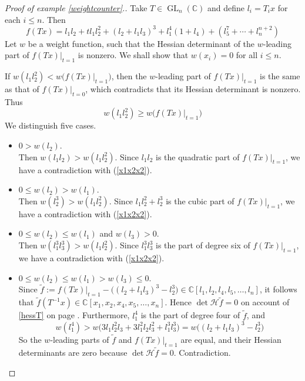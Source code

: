 \documentclass[10pt]{article}
\theoremstyle{remark}
\theoremstyle{definition}
\newcommand{\hess}{{\mathcal H}}
\newcommand{\GL}{\operatorname{GL}}
\newcommand{\C}{{\mathbb C}}
\begin{document}
\begin{proof}[Proof of example \ref{weightcounter}.]
Take $T \in \GL_n(\C)$ and define $l_i = T_i x$ for each $i \le n$. Then
$$
f(Tx) = l_1 l_2 + t l_1 l_2^2 + (l_2 + l_1 l_3)^3 + l_1^4 (1 + l_4) +
        (l_5^7 + \cdots + l_n^{n+2})
$$
Let $w$ be a weight function, such that the Hessian determinant of the $w$-leading part of 
$f(Tx)|_{t=1}$ is nonzero. We shall show that $w(x_i) = 0$ for all $i \le n$. 

If $w(l_1 l_2^2) < w\big(f(Tx)|_{t=1}\big)$, then the $w$-leading part of $f(Tx)|_{t=1}$
is the same as that of $f(Tx)|_{t=0}$, which contradicts that its Hessian determinant is
nonzero. Thus
\begin{equation} \label{x1x2x2}
w (l_1 l_2^2) \ge w \big(f(Tx)|_{t=1}\big)
\end{equation}
We distinguish five cases.
\begin{itemize}
 
\item $0 > w (l_2)$. \\
Then $w(l_1 l_2) > w(l_1 l_2^2)$. Since $l_1 l_2$ is the quadratic part of 
$f(Tx)|_{t=1}$, we have a contradiction with (\ref{x1x2x2}).

\item $0 \le w(l_2) > w(l_1)$. \\
Then $w(l_2^3) > w(l_1 l_2^2)$. Since $l_1 l_2^2 + l_2^3$ is the cubic 
part of $f(Tx)|_{t=1}$, we have a contradiction with (\ref{x1x2x2}).

\item $0 \le w(l_2) \le w(l_1)$ and $w(l_3) > 0$. \\
Then $w(l_1^3l_3^3) > w(l_1 l_2^2)$. Since $l_1^3 l_3^3$ is the 
part of degree six of $f(Tx)|_{t=1}$, we have a contradiction with (\ref{x1x2x2}).

\item $0 \le w(l_2) \le w(l_1) > w(l_3) \le 0$. \\
Since $\tilde{f} := f(Tx)|_{t=1} - \big((l_2 + l_1 l_3)^3 - l_2^3\big) 
\in \C[l_1,l_2,l_4,l_5,\ldots,l_n]$, it follows that $\tilde{f}(T^{-1}x) \in 
\C[x_1,x_2,x_4,x_5,\ldots,x_n]$. Hence $\det \hess \tilde{f} = 0$ 
on account of \eqref{hessT} on page \pageref{hessT}. Furthermore,
$l_1^4$ is the part of degree four of $\tilde{f}$, and
$$
w(l_1^4) > w\big(3l_1 l_2^2 l_3 + 3 l_1^2 l_2 l_3^2 + l_1^3 l_3^3\big) 
               = w\big((l_2 + l_1 l_3)^3 - l_2^3\big)
$$
So the $w$-leading parts of $\tilde{f}$ and $f(Tx)|_{t=1}$ are equal, and
their Hessian determinants are zero because $\det \hess \tilde{f} = 0$. 
Contradiction.


\end{itemize}
\end{proof}
\end{document}
